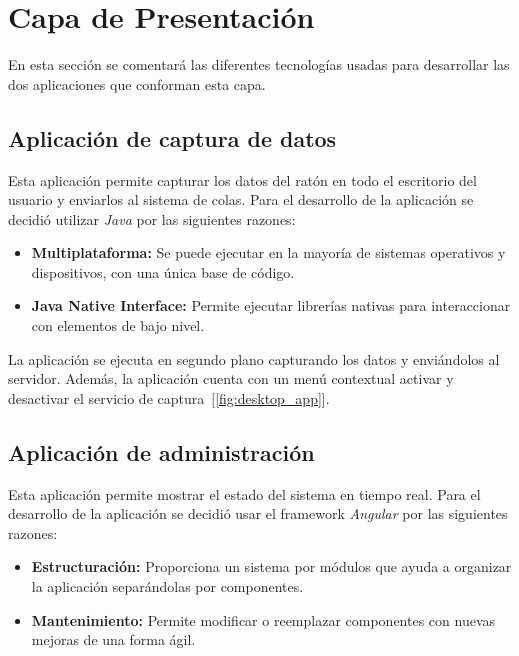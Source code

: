 

\section{Capa de Presentación}

En esta sección se comentará las diferentes tecnologías usadas para desarrollar las dos aplicaciones que conforman esta capa.


\subsection{Aplicación de captura de datos}
\label{sec:system:app_capture}

Esta aplicación permite capturar los datos del ratón en todo el escritorio del usuario y enviarlos al sistema de colas. Para el desarrollo de la aplicación se decidió utilizar \textit{Java} por las siguientes razones:

\begin{itemize}[noitemsep]
    \item \textbf{Multiplataforma:} Se puede ejecutar en la mayoría de sistemas operativos y dispositivos, con una única base de código.
    \item \textbf{Java Native Interface:} Permite ejecutar librerías nativas para interaccionar con elementos de bajo nivel.
\end{itemize}

La aplicación se ejecuta en segundo plano capturando los datos y enviándolos al servidor. Además, la aplicación cuenta con un menú contextual activar y desactivar el servicio de captura~[\cref{fig:desktop_app}].


\subsection{Aplicación de administración}
\label{sec:system:web_admin}

Esta aplicación permite mostrar el estado del sistema en tiempo real. Para el desarrollo de la aplicación se decidió usar el framework \textit{Angular} por las siguientes razones:

\begin{itemize}[noitemsep]
    \item \textbf{Estructuración:} Proporciona un sistema por módulos que ayuda a organizar la aplicación separándolas por componentes.
    \item \textbf{Mantenimiento:} Permite modificar o reemplazar componentes con nuevas mejoras de una forma ágil.
\end{itemize}

